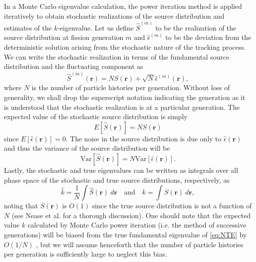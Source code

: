 In a Monte Carlo eigenvalue calculation, the power iteration method is applied
iteratively to obtain stochastic realizations of the source distribution and
estimates of the $k$-eigenvalue. Let us define $\hat{S}^{(m)}$ to be the
realization of the source distribution at fission generation $m$ and
$\hat{\epsilon}^{(m)}$ to be the deviation from the deterministic solution
arising from the stochastic nature of the tracking process. We can write the
stochastic realization in terms of the fundamental source distribution and the
fluctuating component as \cite{ane-brissenden-1986}
\begin{equation}
  \label{eq:source}
  \hat{S}^{(m)}(\mathbf{r})= N S(\mathbf{r}) + \sqrt{N}
  \hat{\epsilon}^{(m)}(\mathbf{r}),
\end{equation}
where $N$ is the number of particle histories per generation. Without loss of
generality, we shall drop the superscript notation indicating the generation as
it is understood that the stochastic realization is at a particular
generation. The expected value of the stochastic source distribution is simply
\begin{equation}
  E \left[ \hat{S}(\mathbf{r})\right] = N S (\mathbf{r})
\end{equation}
since $E \left[ \hat{\epsilon}(\mathbf{r})\right] = 0$. The noise in the source
distribution is due only to $\hat{\epsilon}(\mathbf{r})$ and thus the variance
of the source distribution will be
\begin{equation}
  \text{Var} \left[ \hat{S}(\mathbf{r})\right] = N \text{Var} \left[
    \hat{\epsilon}(\mathbf{r}) \right].
\end{equation}
Lastly, the stochastic and true eigenvalues can be written as integrals over all
phase space of the stochastic and true source distributions, respectively, as
\begin{equation}
  \label{eq:k_to_source}
  \hat{k} = \frac{1}{N} \int \hat{S}(\mathbf{r}) \: d\mathbf{r} \quad \text{and}
  \quad k = \int S(\mathbf{r}) \: d\mathbf{r},
\end{equation}
noting that $S(\mathbf{r})$ is $O(1)$ since the true source distribution is not
a function of $N$ (see Nease et al. \cite{mc-nease-2009} for a thorough
discussion). One should note that the expected value $k$ calculated by Monte
Carlo power iteration (i.e. the method of successive generations) will be biased
from the true fundamental eigenvalue of \eqref{eq:NTE} by $O(1/N)$
\cite{ane-brissenden-1986}, but we will assume henceforth that the number of
particle histories per generation is sufficiently large to neglect this bias.

